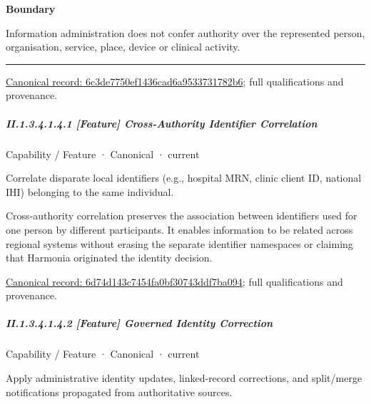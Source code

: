 \textbf{Boundary}



Information administration does not confer authority over the represented person, organisation, service, place, device or clinical activity.



\medskip\hrule\medskip

{\footnotesize \href{../../../../continuum/strategy/capability/6c3de7750ef1436cad6a9533731782b6.md}{Canonical record: 6c3de7750ef1436cad6a9533731782b6}; full qualifications and provenance.}\par
\subparagraph*{II.1.3.4.1.4.1 [Feature] Cross-Authority Identifier Correlation}
\label{navigation:II.1.3.4.1.4.1}

\label{element:6d74d143c7454fa0bf30743ddf7ba094}
{\small Capability / Feature · Canonical · current}\par

Correlate disparate local identifiers (e.g., hospital MRN, clinic client ID, national IHI) belonging to the same individual.



Cross-authority correlation preserves the association between identifiers used for one person by different participants. It enables information to be related across regional systems without erasing the separate identifier namespaces or claiming that Harmonia originated the identity decision.


{\footnotesize \href{../../../../continuum/strategy/capability/feature/6d74d143c7454fa0bf30743ddf7ba094.md}{Canonical record: 6d74d143c7454fa0bf30743ddf7ba094}; full qualifications and provenance.}\par
\subparagraph*{II.1.3.4.1.4.2 [Feature] Governed Identity Correction}
\label{navigation:II.1.3.4.1.4.2}

\label{element:f7ab7a24e8234129b2ab02e9abd4fba2}
{\small Capability / Feature · Canonical · current}\par

Apply administrative identity updates, linked-record corrections, and split/merge notifications propagated from authoritative sources.



